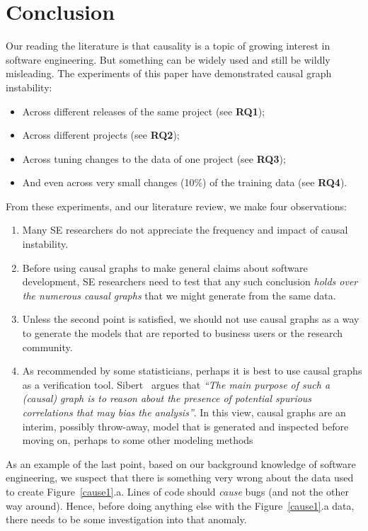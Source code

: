 \documentclass[]{svjour3}
\begin{document}
\section{Conclusion}
Our reading the literature is that causality is a topic of growing interest in software engineering. But something can be widely used and still be wildly misleading.
The experiments of this paper have
demonstrated  causal graph instability:  
\begin{itemize}
\item Across different releases of the same project (see {\bf RQ1});
\item Across different projects (see {\bf RQ2});
\item Across tuning changes to the data of one project (see {\bf RQ3});
\item And even across very small changes (10\%) of the training data (see {\bf RQ4}).
\end{itemize}
From these experiments, and our literature review, we make four observations:
\begin{enumerate}
    \item
Many SE researchers do not appreciate the frequency and impact of causal instability.
\item
Before using causal graphs  to make   general claims about software development,  SE researchers need to test   that any such conclusion 
 {\em holds over the numerous causal graphs} that we might generate from the same data.
 \item
Unless the second point is satisfied,  we should not use causal graphs as a way to generate the models
that are reported to business users or the research community.
\item 
As recommended by some statisticians, perhaps it is best to use causal graphs as a verification tool.  
 Sibert~\cite{SIEBERT2023107198} argues that 
{\em 
``The main purpose of such a (causal) graph is to reason about the presence of potential spurious correlations
that may bias the analysis''}.
In this view, causal graphs are an interim, possibly throw-away, model that is generated and inspected before moving on, perhaps to some other modeling methods
\end{enumerate} 
As an example of the last point,  based on our background knowledge of software engineering, we suspect that there is something very wrong about 
 the data used to create Figure~\ref{cause1}.a.  Lines of code should  {\em cause} bugs (and not the other way around).  Hence, before doing anything else with the Figure~\ref{cause1}.a data, there needs to be some investigation into that anomaly.
\end{document}
